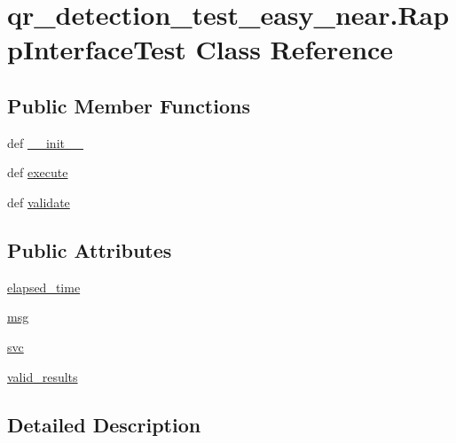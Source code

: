 \hypertarget{classqr__detection__test__easy__near_1_1RappInterfaceTest}{\section{qr\-\_\-detection\-\_\-test\-\_\-easy\-\_\-near.\-Rapp\-Interface\-Test Class Reference}
\label{classqr__detection__test__easy__near_1_1RappInterfaceTest}
}
\subsection*{Public Member Functions}
\begin{DoxyCompactItemize}
\item 
def \hyperlink{classqr__detection__test__easy__near_1_1RappInterfaceTest_a0a5d4cde1e1d029816c94ce30672654b}{\-\_\-\-\_\-init\-\_\-\-\_\-}
\item 
def \hyperlink{classqr__detection__test__easy__near_1_1RappInterfaceTest_a851cc54edf0775aecefa9f4d2d37e975}{execute}
\item 
def \hyperlink{classqr__detection__test__easy__near_1_1RappInterfaceTest_a2e532b7365424c2104cd877eb8b96c64}{validate}
\end{DoxyCompactItemize}
\subsection*{Public Attributes}
\begin{DoxyCompactItemize}
\item 
\hyperlink{classqr__detection__test__easy__near_1_1RappInterfaceTest_a5b81f7c47720123200c133e0da1eabb3}{elapsed\-\_\-time}
\item 
\hyperlink{classqr__detection__test__easy__near_1_1RappInterfaceTest_a897fae4a4c999b2a7b481425748c6731}{msg}
\item 
\hyperlink{classqr__detection__test__easy__near_1_1RappInterfaceTest_aef97c847287caa5ffb1315187f2e3841}{svc}
\item 
\hyperlink{classqr__detection__test__easy__near_1_1RappInterfaceTest_aa80460bb9728f7b3bd759e102f52e95a}{valid\-\_\-results}
\end{DoxyCompactItemize}


\subsection{Detailed Description}


